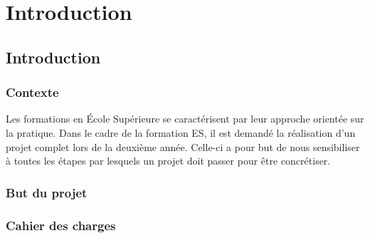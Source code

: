 \cleardoublepage
\part{Introduction}
\cleardoublepage


\chapter{Introduction}

\section{Contexte}

    Les formations en École Supérieure se caractérisent par leur approche orientée sur la pratique.
    Dans le cadre de la formation ES, il est demandé la réalisation d'un projet complet lors de la deuxième année. Celle-ci a pour but de nous sensibiliser à toutes les étapes par lesquels un projet doit passer pour être concrétiser.
   
    
\section{But du projet}
    \lipsum[1]

\section{Cahier des charges}
	